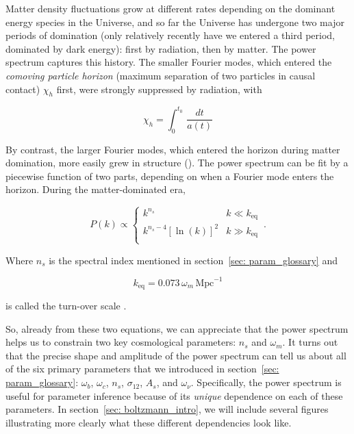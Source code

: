 Matter density fluctuations grow at different rates depending on 
the dominant energy species in the Universe, and so far the Universe has
undergone two major periods of domination (only relatively
recently have we entered a third period, dominated by dark energy): first by 
radiation, then by matter. The power spectrum captures this history. The
smaller Fourier modes, which entered the \textit{comoving particle horizon} 
(maximum
separation of two particles in causal contact) $\chi_h$ first, were strongly
suppressed by radiation, with

\begin{equation}
\chi_h = \int_0^{t_0} \, \frac{dt}{a(t)}
\end{equation}

By contrast, the larger Fourier modes, which
entered the horizon during matter domination, more easily grew in structure
(). The power spectrum can be fit by a piecewise function of 
two parts, depending on when a Fourier mode enters the horizon.
During the matter-dominated era, 

\begin{equation}
P(k) \propto 
\begin{cases}
      k^{n_s} & k \ll k_\text{eq} \\
      k^{n_s - 4} [\ln (k)]^2 & k \gg k_\text{eq} \\ 
    \end{cases}\,.
\end{equation}

Where $n_s$ is the spectral index mentioned in
section~\ref{sec: param_glossary} and

\begin{equation}
\label{eq: turnover}
k_\text{eq} = 0.073 \, \omega_m \, \mathrm{Mpc}^{-1}
\end{equation}

is called the turn-over scale .


So, already from these two equations, we can
appreciate that the power spectrum helps us to constrain two key cosmological
parameters: $n_s$ and $\omega_m$. It turns out that the precise shape and
amplitude of the power spectrum can tell us about all of the six primary
parameters that we introduced in section~\ref{sec: param_glossary}:
$\omega_b$, $\omega_c$, $n_s$, $\sigma_{12}$, $A_s$, and $\omega_\nu$. 
Specifically, the power spectrum is useful for parameter inference because of
its \textit{unique} dependence on each of these parameters. In 
section~\ref{sec: boltzmann_intro}, we will include several figures 
illustrating more clearly what these different dependencies look like.

